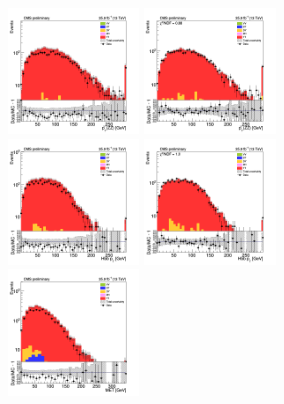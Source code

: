 \begin{figure}[tbp]
  \begin{center}
    \includegraphics[width=0.31\textwidth]{figures/ee_300_april18/hpt0_ee_CRTT_prefit_plot_apr18.png}
    \includegraphics[width=0.31\textwidth]{figures/ee_300_april18/hpt0_ee_CRTT_FullPostfit_plot_apr18.png}\\
    \includegraphics[width=0.31\textwidth]{figures/ee_300_april18/hpt1_ee_CRTT_prefit_plot_apr18.png}
    \includegraphics[width=0.31\textwidth]{figures/ee_300_april18/hpt1_ee_CRTT_FullPostfit_plot_apr18.png}\\
    \includegraphics[width=0.31\textwidth]{figures/ee_300_april18/met_pt_ee_CRTT_prefit_plot_apr18.png}

\end{center}
\end{figure}
